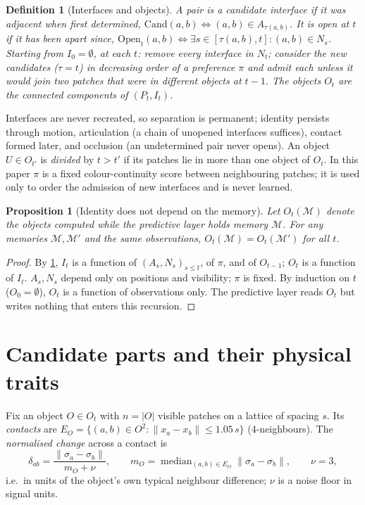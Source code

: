 \documentclass[10pt]{article}
\newtheorem{definition}{Definition}
\newtheorem{proposition}{Proposition}
\newcommand{\M}{\mathcal{M}}
\DeclareMathOperator*{\median}{median}
\begin{document}
\begin{definition}[Interfaces and objects]\label{def:object}
A pair is a \emph{candidate interface} if it was adjacent when first determined, $\mathrm{Cand}(a,b)\Leftrightarrow(a,b)\in A_{\tau(a,b)}$. It is \emph{open} at $t$ if it has been apart since, $\mathrm{Open}_t(a,b)\Leftrightarrow\exists s\in[\tau(a,b),t]:(a,b)\in N_s$. Starting from $I_0=\emptyset$, at each $t$: remove every interface in $N_t$; consider the new candidates ($\tau=t$) in decreasing order of a preference $\pi$ and admit each unless it would join two patches that were in different objects at $t-1$. The objects $O_t$ are the connected components of $(P_t,I_t)$.
\end{definition}

Interfaces are never recreated, so separation is permanent; identity persists through motion, articulation (a chain of unopened interfaces suffices), contact formed later, and occlusion (an undetermined pair never opens). An object $U\in O_{t'}$ is \emph{divided} by $t>t'$ if its patches lie in more than one object of $O_t$. In this paper $\pi$ is a fixed colour-continuity score between neighbouring patches; it is used only to order the admission of new interfaces and is never learned.

\begin{proposition}[Identity does not depend on the memory]\label{prop:identity}
Let $O_t(\M)$ denote the objects computed while the predictive layer holds memory $\M$. For any memories $\M,\M'$ and the same observations, $O_t(\M)=O_t(\M')$ for all $t$.
\end{proposition}
\begin{proof}
By \cref{def:object}, $I_t$ is a function of $(A_s,N_s)_{s\le t}$, of $\pi$, and of $O_{t-1}$; $O_t$ is a function of $I_t$. $A_s,N_s$ depend only on positions and visibility; $\pi$ is fixed. By induction on $t$ ($O_0=\emptyset$), $O_t$ is a function of observations only. The predictive layer reads $O_t$ but writes nothing that enters this recursion.
\end{proof}

\section{Candidate parts and their physical traits}
\label{sec:traits}

Fix an object $O\in O_t$ with $n=|O|$ visible patches on a lattice of spacing $s$. Its \emph{contacts} are $E_O=\{(a,b)\in O^2:\lVert x_a-x_b\rVert\le1.05\,s\}$ (4-neighbours). The \emph{normalised change} across a contact is
\begin{equation}
\delta_{ab}=\frac{\lVert\sigma_a-\sigma_b\rVert}{m_O+\nu},\qquad m_O=\median_{(a,b)\in E_O}\lVert\sigma_a-\sigma_b\rVert,\qquad \nu=3,
\end{equation}
i.e.\ in units of the object's own typical neighbour difference; $\nu$ is a noise floor in signal units.
\end{document}
